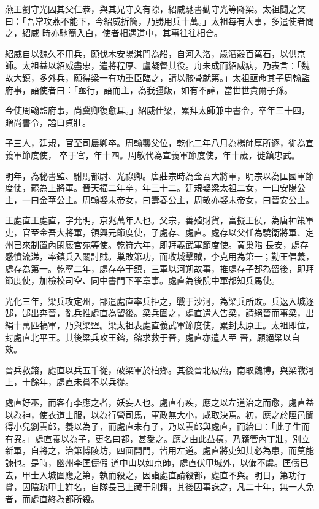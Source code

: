 \begin{pinyinscope}
 燕王劉守光囚其父仁恭，與其兄守文有隙，紹威馳書勸守光等降梁。太祖聞之笑曰：「吾常攻燕不能下，今紹威折簡，乃勝用兵十萬。」太祖每有大事，多遣使者問之，紹威
 時亦馳簡入白，使者相遇道中，其事往往相合。



 紹威自以魏久不用兵，願伐木安陽淇門為船，自河入洛，歲漕穀百萬石，以供京師。太祖益以紹威盡忠，遣將程厚、盧凝督其役。舟未成而紹威病，乃表言：「魏故大鎮，多外兵，願得梁一有功重臣臨之，請以骸骨就第。」太祖亟命其子周翰監府事，語使者曰：「亟行，語而主，為我彊飯，如有不諱，當世世貴爾子孫。



 今使周翰監府事，尚冀卿復愈耳。」紹威仕梁，累拜太師兼中書令，卒年三十四，贈尚書令，謚曰貞壯。



 子三人，廷規，官至司農卿卒。周翰襲父位，乾化二年八月為楊師厚所逐，徙為宣義軍節度使，
 卒于官，年十四。周敬代為宣義軍節度使，年十歲，徙鎮忠武。



 明年，為秘書監、駙馬都尉、光祿卿。唐莊宗時為金吾大將軍，明宗以為匡國軍節度使，罷為上將軍。晉天福二年卒，年三十二。廷規娶梁太祖二女，一曰安陽公主，一曰金華公主。周翰娶末帝女，曰壽春公主，周敬亦娶末帝女，曰晉安公主。



 王處直王處直，字允明，京兆萬年人也。父宗，善殖財貨，富擬王侯，為唐神策軍吏，官至金吾大將軍，領興元節度使，子處存、處直。處存以父任為驍衛將軍、定州已來制置內閑廄宮苑等使。乾符六年，即拜義武軍節度使。黃巢陷
 長安，處存感憤流涕，率鎮兵入關討賊。巢敗第功，而收城擊賊，李克用為第一；勤王倡義，處存為第一。乾寧二年，處存卒于鎮，三軍以河朔故事，推處存子郜為留後，即拜節度使，加檢校司空、同中書門下平章事。處直為後院中軍都知兵馬使。



 光化三年，梁兵攻定州，郜遣處直率兵拒之，戰于沙河，為梁兵所敗。兵返入城逐郜，郜出奔晉，亂兵推處直為留後。梁兵圍之，處直遣人告梁，請絕晉而事梁，出絹十萬匹犒軍，乃與梁盟。梁太祖表處直義武軍節度使，累封太原王。太祖即位，封處直北平王。其後梁兵攻王鎔，鎔求救于晉，處直亦遣人至
 晉，願絕梁以自效。



 晉兵救鎔，處直以兵五千從，破梁軍於柏鄉。其後晉北破燕，南取魏博，與梁戰河上，十餘年，處直未嘗不以兵從。



 處直好巫，而客有李應之者，妖妄人也。處直有疾，應之以左道治之而愈，處直益以為神，使衣道士服，以為行營司馬，軍政無大小，咸取決焉。初，應之於陘邑闌得小兒劉雲郎，養以為子，而處直未有子，乃以雲郎與處直，而紿曰：「此子生而有異。」處直養以為子，更名曰都，甚愛之。應之由此益橫，乃籍管內丁壯，別立新軍，自將之，治第博陵坊，四面開門，皆用左道。處直將吏知其必為患，而莫能諫也。是時，幽州李匡儔假
 道中山以如京師，處直伏甲城外，以備不虞。匡儔已去，甲士入城圍應之第，執而殺之，因詣處直請殺都，處直不與。明日，第功行賞，因陰疏甲士姓名，自隊長已上藏于別籍，其後因事誅之，凡二十年，無一人免者，而處直終為都所殺。




\end{pinyinscope}
